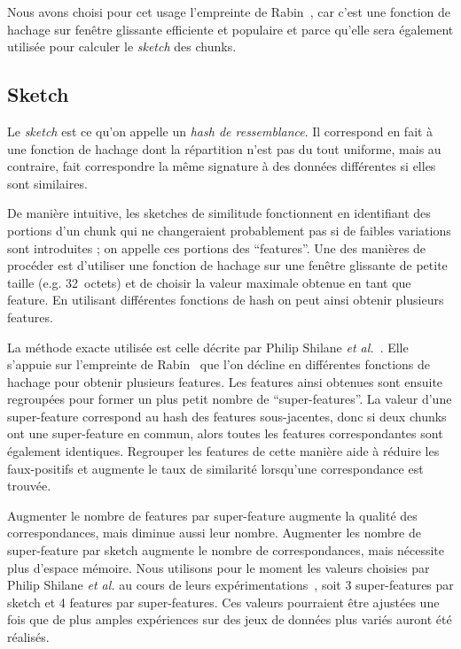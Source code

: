 \documentclass[a4paper]{report}
\makeatletter
\newcommand{\etal}{\emph{et al.}\@\xspace}
\makeatother
\begin{document}
Nous avons choisi pour cet usage l'empreinte de Rabin~\cite{rabin1981fingerprinting}, car c'est une fonction de hachage sur fenêtre glissante efficiente et populaire et parce qu'elle sera également utilisée pour calculer le \emph{sketch} des chunks.

\subsection{Sketch}

Le \emph{sketch} est ce qu'on appelle un \emph{hash de ressemblance}.
Il correspond en fait à une fonction de hachage dont la répartition n'est pas du tout uniforme,
mais au contraire, fait correspondre la même signature à des données différentes si elles sont similaires.

De manière intuitive, les sketches de similitude fonctionnent en identifiant des portions d'un chunk
qui ne changeraient probablement pas si de faibles variations sont introduites ;
on appelle ces portions des ``features''.
Une des manières de procéder est d'utiliser une fonction de hachage sur une fenêtre glissante de petite taille
(e.g. 32~octets) et de choisir la valeur maximale obtenue en tant que feature.
En utilisant différentes fonctions de hash on peut ainsi obtenir plusieurs features.

La méthode exacte utilisée est celle décrite par Philip Shilane \etal~\cite{shilane2012wan}.
Elle s'appuie sur l'empreinte de Rabin~\cite{rabin1981fingerprinting}
que l'on décline en différentes fonctions de hachage pour obtenir plusieurs features.
Les features ainsi obtenues sont ensuite regroupées pour former un plus petit nombre de ``super-features''.
La valeur d'une super-feature correspond au hash des features sous-jacentes,
donc si deux chunks ont une super-feature en commun,
alors toutes les features correspondantes sont également identiques.
Regrouper les features de cette manière aide à réduire les faux-positifs
et augmente le taux de similarité lorsqu'une correspondance est trouvée.

Augmenter le nombre de features par super-feature augmente la qualité des correspondances,
mais diminue aussi leur nombre.
Augmenter les nombre de super-feature par sketch augmente le nombre de correspondances,
mais nécessite plus d'espace mémoire.
Nous utilisons pour le moment les valeurs choisies par Philip Shilane \etal
au cours de leurs expérimentations~\cite{shilane2012wan},
soit 3 super-features par sketch et 4 features par super-features.
Ces valeurs pourraient être ajustées une fois que de plus amples expériences
sur des jeux de données plus variés auront été réalisés.
\end{document}
